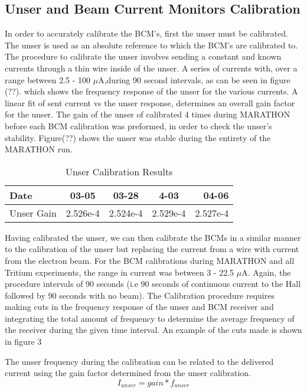 \subsection{Unser and Beam Current Monitors Calibration}
In order to accurately calibrate the BCM's, first the unser must be calibrated. The unser is used as an absolute reference to which the BCM's are calibrated to. The procedure to calibrate the unser involves sending a constant and known currents through a thin wire inside of the unser. A series of currents with, over a range between 2.5 - 100 $\mu$A,during 90 second intervals, as can be seen in figure (??). which shows the frequency response of the unser for the various currents. A linear fit of sent current vs the unser response, determines an overall gain factor for the unser. The gain of the unser of calibrated 4 times during MARATHON before each BCM calibration was preformed, in order to check the unser's stability. Figure(??) shows the unser was stable during the entirety of the MARATHON run. 

\begin{table}[ht]
\caption{Unser Calibration Results}
\begin{center}
\begin{tabular}{l| c| c| c| r}
Date & 03-05 & 03-28 & 4-03 & 04-06  \\
\hline
Unser Gain & 2.526e-4 & 2.524e-4 & 2.529e-4 & 2.527e-4\\
\end{tabular}
\end{center}
\end{table}

Having calibrated the unser, we can then calibrate the BCMs in a similar manner to the calibration of the unser but replacing the current from a wire with current from the electron beam. For the BCM calibrations during MARATHON and all Tritium experiments, the range in current was between 3 - 22.5 $\mu$A. Again, the procedure intervals of 90 seconds (i.e 90 seconds of continuous current to the Hall followed by 90 seconds with no beam). 
The Calibration procedure requires making cuts in the frequency response of the unser and BCM receiver and integrating the total amount of frequency to determine the average frequency of the receiver during the given time interval. An example of the cuts made is shown in figure 3

The unser frequency during the calibration can be related to the delivered current using the gain factor determined from the unser calibration. 
\begin{equation}
I_{unser} = gain * f_{unser}
\end{equation}

